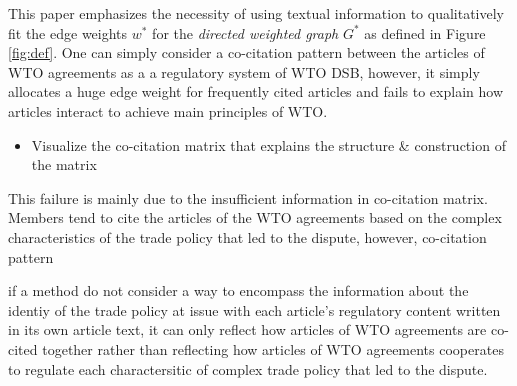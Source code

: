 This paper emphasizes the necessity of using textual information 
to qualitatively fit the edge weights $w^*$ for the \textit{directed weighted graph} $G^*$ as defined in Figure \ref{fig:def}. 
One can simply consider a co-citation pattern between the articles of WTO agreements as a a regulatory system of WTO DSB, however,
it simply allocates a huge edge weight for frequently cited articles and fails to explain how articles interact to achieve main principles of WTO.

\begin{itemize}
    \item Visualize the co-citation matrix that explains the structure \& construction of the matrix
\end{itemize}

This failure is mainly due to the insufficient information in co-citation matrix. Members tend to cite the articles of 
the WTO agreements based on the complex characteristics of 
the trade policy that led to the dispute, however, co-citation pattern 


if a method 
do not consider a way to encompass the information
about the identiy of the trade policy at issue with 
each article's regulatory content written in its own article text,
it can only reflect how articles of WTO agreements are co-cited 
together rather than reflecting how articles of WTO agreements 
cooperates to regulate each charactersitic of complex trade policy that led to the dispute. 
